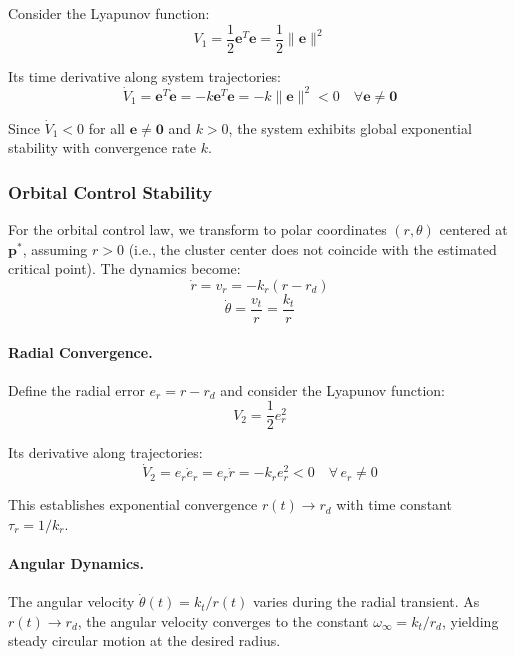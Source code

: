 \documentclass[lettersize,journal]{IEEEtran}
\begin{document}
Consider the Lyapunov function:
\begin{equation}
V_1 = \frac{1}{2}\mathbf{e}^T\mathbf{e} = \frac{1}{2}\|\mathbf{e}\|^2
\end{equation}

Its time derivative along system trajectories:
\begin{equation}
\dot{V}_1 = \mathbf{e}^T\dot{\mathbf{e}} = -k\mathbf{e}^T\mathbf{e} = -k\|\mathbf{e}\|^2 < 0 \quad \forall \mathbf{e} \neq \mathbf{0}
\end{equation}

Since $\dot{V}_1 < 0$ for all $\mathbf{e} \neq \mathbf{0}$ and $k > 0$, the system exhibits global exponential stability with convergence rate $k$.

\subsubsection{Orbital Control Stability}

For the orbital control law, we transform to polar coordinates $(r, \theta)$ centered at $\mathbf{p}^*$, assuming $r > 0$ (i.e., the cluster center does not coincide with the estimated critical point). The dynamics become:
\begin{equation}
\dot{r} = v_r = -k_r(r - r_d)
\end{equation}
\begin{equation}
\dot{\theta} = \frac{v_t}{r} = \frac{k_t}{r}
\end{equation}


\paragraph{Radial Convergence.}
Define the radial error $e_r = r - r_d$ and consider the Lyapunov function:
\begin{equation}
V_2 = \frac{1}{2}e_r^2
\end{equation}

Its derivative along trajectories:
\begin{equation}
\dot{V}_2 = e_r \dot{e}_r = e_r \dot{r} = -k_r e_r^2 < 0 \quad \forall\, e_r \neq 0
\end{equation}

This establishes exponential convergence $r(t) \to r_d$ with time constant $\tau_r = 1/k_r$.

\paragraph{Angular Dynamics.}
The angular velocity $\dot{\theta}(t) = k_t / r(t)$ varies during the radial transient. As $r(t) \to r_d$, the angular velocity converges to the constant $\omega_\infty = k_t / r_d$, yielding steady circular motion at the desired radius.
\end{document}
